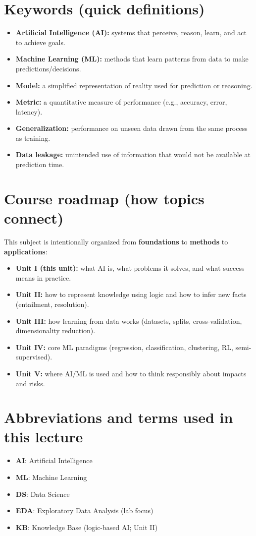 \documentclass[11pt]{article}
\begin{document}
\section{Keywords (quick definitions)}
\begin{itemize}[leftmargin=*]
  \item \textbf{Artificial Intelligence (AI):} systems that perceive, reason, learn, and act to achieve goals.
  \item \textbf{Machine Learning (ML):} methods that learn patterns from data to make predictions/decisions.
  \item \textbf{Model:} a simplified representation of reality used for prediction or reasoning.
  \item \textbf{Metric:} a quantitative measure of performance (e.g., accuracy, error, latency).
  \item \textbf{Generalization:} performance on unseen data drawn from the same process as training.
  \item \textbf{Data leakage:} unintended use of information that would not be available at prediction time.
\end{itemize}

\section{Course roadmap (how topics connect)}
This subject is intentionally organized from \textbf{foundations} to \textbf{methods} to \textbf{applications}:
\begin{itemize}[leftmargin=*]
  \item \textbf{Unit I (this unit):} what AI is, what problems it solves, and what success means in practice.
  \item \textbf{Unit II:} how to represent knowledge using logic and how to infer new facts (entailment, resolution).
  \item \textbf{Unit III:} how learning from data works (datasets, splits, cross-validation, dimensionality reduction).
  \item \textbf{Unit IV:} core ML paradigms (regression, classification, clustering, RL, semi-supervised).
  \item \textbf{Unit V:} where AI/ML is used and how to think responsibly about impacts and risks.
\end{itemize}

\section{Abbreviations and terms used in this lecture}
\begin{itemize}[leftmargin=*]
  \item \textbf{AI}: Artificial Intelligence
  \item \textbf{ML}: Machine Learning
  \item \textbf{DS}: Data Science
  \item \textbf{EDA}: Exploratory Data Analysis (lab focus)
  \item \textbf{KB}: Knowledge Base (logic-based AI; Unit II)
\end{itemize}
\end{document}
